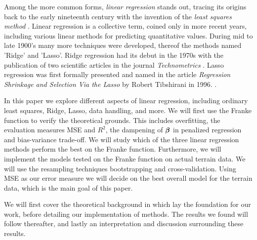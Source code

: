Among the more common forms, \textit{linear regression} stands out, tracing its origins back to the early nineteenth century with the invention of the \textit{least squares method} \citep[ p.~5]{james}. 
Linear regression is a collective term, coined only in more recent years, including various linear methods for predicting quantitative values. During mid to late 1900's many more techniques were developed, thereof the methods named 'Ridge' and 'Lasso'. Ridge regression had its debut in the 1970s with the publication of two scientific articles in the journal \textit{Technometrics} \cite{hoerl}. Lasso regression was first formally presented and named in the article \textit{Regression Shrinkage and Selection Via the Lasso} by Robert Tibshirani in 1996. \cite{tibshirani}. 


In this paper we explore different aspects of linear regression, including ordinary least squares, Ridge, Lasso, data handling, and more. 
We will first use the Franke function to verify the theoretical grounds. This includes overfitting, the evaluation measures MSE and $R^2$, the dampening of $\boldsymbol{\beta}$ in penalized regression and bias-variance trade-off. 
We will study which of the three linear regression methods perform the best on the Franke function.
Furthermore, we will implement the models tested on the Franke function on actual terrain data. 
We will use the resampling techniques bootstrapping and cross-validation. 
Using MSE as our error measure we will decide on the best overall model for the terrain data, which is the main goal of this paper. 


We will first cover the theoretical background in which lay the foundation for our work, before detailing our implementation of methods. 
The results we found will follow thereafter, and lastly an interpretation and discussion surrounding these results. 

